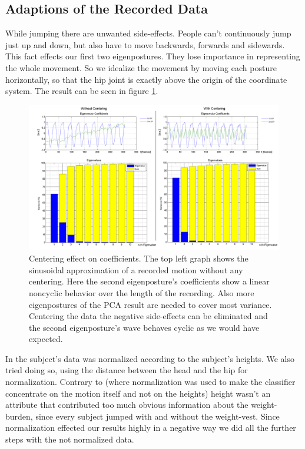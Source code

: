 \documentclass[a4paper]{article}
\begin{document}
\subsection{Adaptions of the Recorded Data}
While jumping there are unwanted side-effects. People can't continuously jump just up and down, but also have to move backwards, forwards and sidewards. This fact effects our first two eigenpostures. They lose importance in representing the whole movement. So we idealize the movement by moving each posture horizontally, so that the hip joint is exactly above the origin of the coordinate system.
The result can be seen in figure \ref{fig:sammel}. 

\begin{figure}
	\centering
	\includegraphics[width=15cm]{sammel.png}
	\caption{Centering effect on coefficients. The top left graph shows the sinusoidal approximation of a recorded motion without any centering.
	Here the second eigenposture's coefficients show a linear noncyclic behavior over the length of the recording.
	Also more eigenpostures of the PCA result are needed to cover most variance.
	Centering the data the negative side-effects can be eliminated and the second eigenposture's wave behaves cyclic as we would have expected.}
	\label{fig:sammel}
\end{figure}

In \cite{origin} the subject's data was normalized according to the subject's heights. We also tried doing so, using the distance between the head and the hip for normalization. Contrary to \cite{origin} (where normalization was used to make the classifier concentrate on the motion itself and not on the heights) height wasn't an attribute that contributed too much obvious information about the weight-burden, since every subject jumped with and without the weight-vest. Since normalization effected our results highly in a negative way we did all the further steps with the not normalized data.
\end{document}
